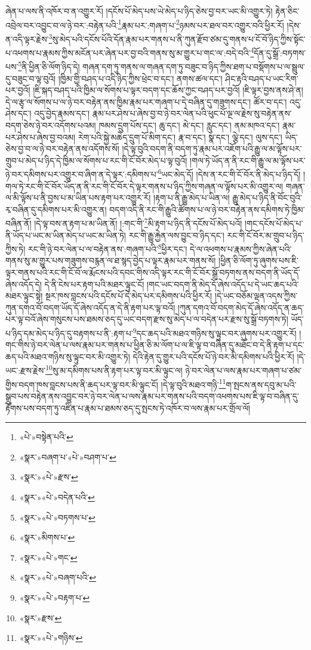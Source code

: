 ཞེན་པ་ལས་ནི་འཁོར་བ་ན་འགྱུར་རོ། །དངོས་པོ་མེད་པས་ཡེ་མེད་པ་ཉིད་ཅེས་བྱ་བར་ཡང་མི་འགྱུར་ཏེ། རྟེན་ཅིང་འབྲེལ་བར་འབྱུང་བ་ལ་ཉེ་བར་:བརྟེན་པའི་\footnote{«པེ་»བསྟེན་པའི་}རྣམ་པར་:གཞག་པ་\footnote{«སྣར་»བཞག་པ་«པེ་»བཤག་པ་}ཉམས་པར་ཐལ་བར་འགྱུར་བའི་ཕྱིར་རོ། །དེས་ན་འདི་ལྟར་རྗེས་\footnote{«སྣར་»«པེ་»རྫས་}སུ་མེད་པའི་དངོས་པོའི་དོན་རྣམ་པར་གནས་པ་ནི་ཀུན་རྫོབ་ཙམ་དུ་གནས་པ་ངོ་བོ་ཉིད་ཀྱིས་སྟོང་པ་འཕགས་པ་རྣམས་ཀྱིས་མངོན་པར་ཞེན་པར་བྱ་བའི་གནས་སུ་མ་གྱུར་པ་གང་ལ་:བདེ་བའི་\footnote{«སྣར་»«པེ་»བདེན་པའི་}དོན་དུ་སྒྲོ་:བཏགས་པས་\footnote{«སྣར་»«པེ་»བཏགས་པ་}ནི་ཕྱིན་ཅི་ལོག་ཉིད་དེ། གཞན་དག་ཏུ་གནས་ལ་གཞན་དག་ཏུ་བཟུང་བ་ཉིད་ཀྱིས་ཐག་པ་བསྡོགས་པ་ལ་སྦྲུལ་དུ་བཟུང་བ་ལྟ་བུའོ། །ཁྱིམ་གྱི་བཤད་པ་འདི་ཉིད་ཀྱིས་ཕྲེང་བ་དང་། ནགས་ཚལ་དང་། ཤིང་རྟའི་བཤད་པ་ཡང་རིག་པར་བྱའོ། །ཇི་སྐད་བཤད་པའི་ཁྱིམ་ལ་སོགས་པ་ལྟར་བདག་དང་ཆོས་ཀྱང་བཤད་པར་བྱའོ། །ཇི་ལྟར་བྱས་ནས་ཤེ་ན། དེ་ལ་རྩྭ་ལ་སོགས་པ་ལ་ཉེ་བར་བརྟེན་ནས་ཁྱིམ་རྣམ་པར་གཞག་པ་དེ་བཞིན་དུ་གཟུགས་དང་། ཚོར་བ་དང་། འདུ་ཤེས་དང་། འདུ་བྱེད་རྣམས་དང་། རྣམ་པར་ཤེས་པ་ཞེས་བྱ་བ་ཉེ་བར་ལེན་པའི་ཕུང་པོ་ལྔ་ལ་རྗེས་སུ་བརྟེན་ནས་བདག་ཅེས་ཉེ་བར་འདོགས་པའམ། ཁམས་དྲུག་པོས་དང་། ཆུ་དང་། མེ་དང་། རླུང་དང་། ནམ་མཁའ་དང་། རྣམ་པར་ཤེས་པ་ཞེས་བྱ་བའམ། རེག་པའི་སྐྱེ་མཆེད་དྲུག་པོ་མིག་དང་། རྣ་བ་དང་། སྣ་དང་། ལྕེ་དང་། ལུས་དང་། ཡིད་ཅེས་བྱ་བ་ལ་ཉེ་བར་བརྟེན་ནས་འདོགས་སོ། །དེ་ལྟ་བུའི་བདག་ནི་བདག་ཏུ་རྣམ་པར་འཇོག་པའི་རྒྱུ་ལ་མ་ལྟོས་པར་གྲུབ་པ་མེད་པ་ཉིད་དེ་ཁྱིམ་ལ་སོགས་པ་རང་གི་ངོ་བོར་མེད་པ་ལྟ་བུའོ། །གལ་ཏེ་ཡོད་ན་ནི་རང་གི་རྒྱུ་ལ་མ་ལྟོས་པར་ཉེ་བར་དམིགས་པར་འགྱུར་བ་ཞིག་ན་དེ་ལྟར་:དམིགས་པ་\footnote{«སྣར་»མིགས་པ་}ཡང་མེད་དོ། །དེས་ན་རང་གི་ངོ་བོར་ནི་མེད་པ་ཉིད་དོ། །གལ་ཏེ་རང་གི་ངོ་བོར་ཡོད་ན་ནི་རང་གི་ངོ་བོར་དེ་ལྟར་གནས་པ་ཉིད་ཀྱིས་གཞན་ལ་ལྟོས་པར་མི་འགྱུར་ལ། གཞན་ལ་མི་ལྟོས་པ་ནི་བྱས་པ་མ་ཡིན་པས་རྟག་པར་འགྱུར་རོ། །རྟག་པ་ནི་རྒྱུ་མེད་པ་ཡིན་ལ། རྒྱུ་མེད་པ་ཉིད་ནི་བོང་བུའི་རྭ་བཞིན་དུ་དམིགས་པར་མི་འགྱུར་ན། བདག་འདི་ནི་རང་གི་རྒྱུའི་ཚོགས་པ་ལ་ཉེ་བར་བརྟེན་ནས་དམིགས་ཏེ་ཁྱིམ་བཞིན་ནོ། །དེ་ལྟ་བས་ན་རྟག་པ་མ་ཡིན་ནོ། །:གང་གི་\footnote{«སྣར་»«པེ་»གང་}མི་རྟག་པ་ཉིད་ནི་དངོས་པོ་མེད་པའོ། །གང་དངོས་པོ་མེད་པ་ནི་ཡོད་པ་ཡང་མ་ཡིན་མེད་པ་ཡང་མ་ཡིན་ཏེ། རང་གི་རྒྱུ་རྐྱེན་ལས་བྱུང་བ་ཉིད་དང་། རང་གི་ངོ་བོར་མ་གྲུབ་པ་ཉིད་ཀྱིས་ཏེ། རང་གི་ཉེ་བར་ལེན་པ་ལ་བརྟེན་ནས་:གཞག་པའི་\footnote{«སྣར་»«པེ་»བཞག་པའི་}ཕྱིར་དང་། དེ་ལ་འཕགས་པ་རྣམས་ཀྱིས་ཞེན་པའི་གནས་སུ་མ་གྱུར་པས་གཟུགས་བརྙན་ལ་ཐ་སྙད་བྱེད་པ་ལྟར་རྣམ་པར་གནས་སོ། །ཕྱིན་ཅི་ལོག་ཏུ་ཞུགས་པས་ཇི་ལྟར་གནས་པའི་རང་གི་ངོ་བོ་ལ་རྨོངས་པའི་དབང་གིས་འདི་ལྟར་རང་གི་ངོ་བོར་སྒྲོ་བཏགས་ནས་བདག་ནི་ཡོད་དོ་ཞེས་འདོད་དེ། དེ་ནི་ངེས་པར་རྟག་པའི་མཐར་ལྟུང་ངོ། །གང་ཡང་བདག་ནི་མེད་དོ་ཞེས་འདོད་པ་དེ་ཡང་ཆད་པའི་མཐར་ལྟུང་སྟེ། སྔར་ཁས་བླངས་པའི་དངོས་པོ་དེ་མེད་པར་དམིགས་པའི་ཕྱིར་རོ། །དེ་ཡང་བཅོམ་ལྡན་འདས་ཀྱིས་ཀུན་དགའ་བོ་བདག་ཡོད་དོ་ཞེས་འདོད་ན་དེ་ནི་རྟག་པར་ལྟ་བའོ། །ཀུན་དགའ་བོ་བདག་མེད་དོ་ཞེས་འདོད་ན་ཆད་པར་ལྟ་བའོ་ཞེས་གསུངས་པས་ཐམས་ཅད་དུ་ཡང་བདག་རྫས་སུ་མེད་པ་ལ་བདེན་པར་རྫས་སུ་སྒྲོ་བཏགས་ཏེ། ཡོད་པ་ཉིད་དམ་མེད་པ་ཉིད་དུ་བརྟགས་པ་ནི་:རྟག་པ་\footnote{«སྣར་»«པེ་»བརྟག་པ་}དང་ཆད་པའི་མཐའ་གཉིས་སུ་ལྟུང་བར་ཞུགས་པར་འགྱུར་རོ། །གང་གིས་ཉེ་བར་ལེན་པ་ལས་རྣམ་པར་གནས་པ་ཕྱིན་ཅི་མ་ལོག་པ་ལ་ཇི་ལྟ་བ་བཞིན་དུ་མཐོང་བ་དེ་ནི་རྟག་པ་དང་ཆད་པའི་མཐའ་གཉིས་སུ་ལྟུང་བར་མི་འགྱུར་ཏེ། དེའི་རྟེན་དུ་གྱུར་པའི་དངོས་པོ་ཉེ་བར་མི་དམིགས་པའི་ཕྱིར་རོ། །དེ་ཡང་:རྫས་རྗེས་\footnote{«སྣར་»རྫས་}སུ་མ་དམིགས་པས་ནི་རྟག་པར་ལྟ་བར་མི་ལྟུང་ལ། ཉེ་བར་ལེན་པ་ལས་རྣམ་པར་གཞག་པ་ཙམ་གྱིས་བདག་ཁས་བླངས་པས་ནི་ཆད་པར་ལྟ་བར་མི་ལྟུང་ངོ། །དེ་ལྟ་བུའི་མཐའ་གཉི་\footnote{«སྣར་»«པེ་»གཉིས་}ག་སྤངས་ནས་དབུ་མ་པའི་སྒྲུབ་པས་བརྟེན་ནས་འབྱུང་བར་ཉེ་བར་ལེན་པ་ལས་རྣམ་པར་གནས་པའི་བདག་འཕགས་པས་ཇི་ལྟ་བ་བཞིན་དུ་རྟོགས་པས་བདག་ཏུ་འཛིན་པ་རྣམ་པ་ཐམས་ཅད་དུ་སྤངས་ཏེ་འཁོར་བ་ལས་རྣམ་པར་གྲོལ་ལོ། 